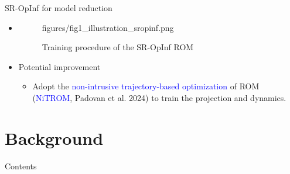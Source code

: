 \documentclass[presentation]{beamer}
\begin{document}
\begin{frame}[label={sec:org1809a1d}]{SR-OpInf for model reduction}
\begin{itemize}
\item \begin{figure}[tbp]
\centering
\begin{tikzonimage}[width=0.9\linewidth]{figures/fig1_illustration_sropinf.png}%
\end{tikzonimage}
  \vspace{-1em}
  \caption{Training procedure of the SR-OpInf ROM}
  \label{fig:1_illustration_sropinf}
\end{figure}
\vspace{-1em}
\item Potential improvement
\begin{itemize}
\item Adopt the \textcolor{blue}{non-intrusive trajectory-based optimization} of ROM (\textcolor{blue}{NiTROM}, Padovan et al. 2024) to train the projection and dynamics.
\end{itemize}
\end{itemize}
\end{frame}

\section{Background}
\label{sec:orgde72cc0}
\begin{frame}{Contents}
\end{frame}
\end{document}
